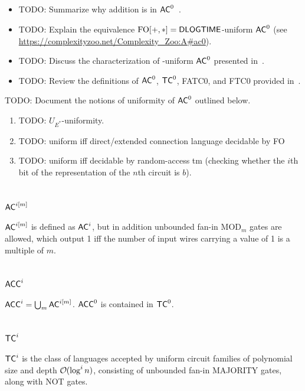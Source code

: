 \subsection{}
\begin{itemize}
\item TODO: Summarize why addition is in $\mathsf{AC}^{0}$~\cite{BussLectureNotes}.
\item TODO: Explain the equivalence $\text{FO}[+, *] = \mathsf{DLOGTIME}$-uniform $\mathsf{AC}^{0}$ (see \url{https://complexityzoo.net/Complexity_Zoo:A#ac0}).
\item TODO: Discuss the characterization of -uniform $\mathsf{AC}^{0}$ presented in~\cite{hella2023regularrepresentationsuniformtc0}.
\item TODO: Review the definitions of $\mathsf{AC}^{0}$, $\mathsf{TC}^{0}$, FATC0, and FTC0 provided in~\cite{612309}.
\end{itemize}
TODO: Document the notions of uniformity of $\mathsf{AC}^{0}$ outlined below.
\begin{enumerate}
\item TODO: $U_{E^*}$-uniformity.
\item TODO: uniform iff direct/extended connection language decidable by FO 
\item TODO: uniform iff decidable by  random-access tm (checking whether the $i$th bit of the representation of the $n$th circuit is $b$).
\end{enumerate}



\section{\texorpdfstring{$\mathsf{AC}^{i[m]}$}{AC\string^i[m]}}
$\mathsf{AC}^{i[m]}$ is defined as $\mathsf{AC}^{i}$, but in addition unbounded fan-in $\text{MOD}_m$ gates
are allowed, which output 1 iff the number of input wires carrying a value of 1 is a
multiple of $m$.

\section{\texorpdfstring{$\mathsf{ACC}^{i}$}{\string^i}}
$\mathsf{ACC}^{i} = \bigcup_m \mathsf{AC}^{i[m]}$. $\mathsf{ACC}^{0}$ is contained in $\mathsf{TC}^{0}$.

\section{\texorpdfstring{$\mathsf{TC}^{i}$}{TC\string^i}}
$\mathsf{TC}^{i}$ is the class of languages accepted by uniform circuit families 
of polynomial size and depth $\bigO(\log^i n)$, consisting of unbounded fan-in MAJORITY
gates, along with NOT gates.

